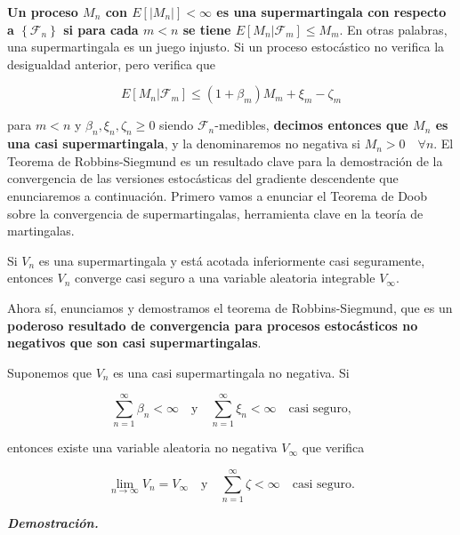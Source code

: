 \textbf{Un proceso $M_n$ con $E[|M_n|] < \infty$ es una supermartingala con respecto a $\left \{ \mathcal{F}_n \right \}$ si para cada $m<n$ se tiene $E[M_n | \mathcal{F}_m] \leq M_m$}. En otras palabras, una supermartingala es un juego injusto. Si un proceso estocástico no verifica la desigualdad anterior, pero verifica que 

\begin{equation*}
	E[M_n | \mathcal{F}_m] \leq (1 + \beta _m ) M_m + \xi _m - \zeta _m
\end{equation*}

para $m<n$ y $\beta _n, \xi _n, \zeta _n \geq 0$ siendo $\mathcal{F}_n$-medibles, \textbf{decimos entonces que $M_n$ es una casi supermartingala}, y la denominaremos  no negativa si $M_n>0 \quad \forall n$. El Teorema de Robbins-Siegmund es un resultado clave para la demostración de la convergencia de las versiones estocásticas del gradiente descendente que enunciaremos a continuación. Primero vamos a enunciar el Teorema de Doob sobre la convergencia de supermartingalas, herramienta clave en la teoría de martingalas.


\begin{teorema}\label{teor:convdoob}
 Si $V_n$ es una supermartingala y está acotada inferiormente casi seguramente, entonces $V_n$ converge casi seguro a una variable aleatoria integrable $V_{\infty}$.
 \end{teorema}






Ahora sí, enunciamos y demostramos el teorema de Robbins-Siegmund, que es un \textbf{poderoso resultado de convergencia para procesos estocásticos no negativos que son casi supermartingalas}. 

\begin{teorema}\label{teor:sig}
	Suponemos que $V_n$ es una casi supermartingala no negativa. Si 

	$$ \sum_{n=1}^{\infty} \beta_n < \infty \quad \text{y} \quad \sum_{n=1}^{\infty} \xi_n < \infty \quad \text{casi seguro,}$$

	entonces existe una variable aleatoria no negativa $V_{\infty}$ que verifica

	$$ \displaystyle \lim_{n \to \infty}V_n = V_{\infty} \quad \text{y} \quad \sum_{n=1}^{\infty} \zeta < \infty \quad \text{casi seguro.}$$
\end{teorema}


\begin{flushleft}
   \textbf{\textit{Demostración.}}
\end{flushleft} 


